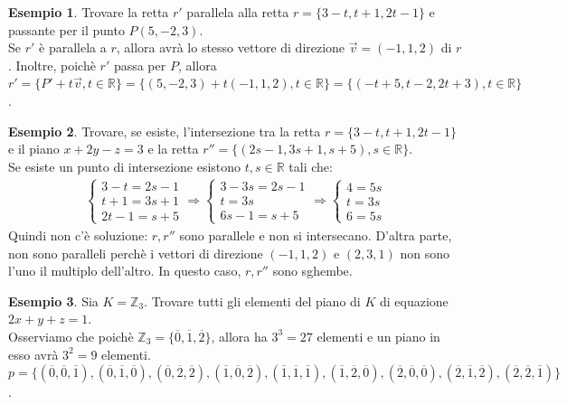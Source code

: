 \documentclass[a4paper]{article}
\theoremstyle{definition}
\newtheorem*{es}{Esempio}
\begin{document}
	\begin{es}
		Trovare la retta $r'$ parallela alla retta $r = \{3 - t, t + 1, 2t - 1\}$ e passante per il punto $P(5, -2, 3)$. \\
		Se $r'$ è parallela a $r$, allora avrà lo stesso vettore di direzione $\overrightarrow{v} = (-1, 1, 2)$ di $r$.
		Inoltre, poichè $r'$ passa per $P$, allora $r' = \{P' + t \overrightarrow{v}, t \in \mathbb{R}\}
		= \{(5, -2, 3) + t(-1, 1, 2), t \in \mathbb{R}\} = \{(-t + 5, t - 2, 2t + 3), t \in \mathbb{R}\}$.
	\end{es}

	\begin{es}
		Trovare, se esiste, l'intersezione tra la retta $r = \{3 - t, t + 1, 2t - 1\}$ e il piano $x + 2y - z = 3$ e la retta
		$r'' = \{(2s - 1, 3s + 1, s + 5), s \in \mathbb{R}\}$. \\
		Se esiste un punto di intersezione esistono $t, s \in \mathbb{R}$ tali che:
		\begin{align*}
			\begin{cases}
				3 - t = 2s - 1 \\
				t + 1 = 3s + 1 \\
				2t - 1 = s + 5
			\end{cases} \Rightarrow \begin{cases}
				3 - 3s = 2s - 1 \\
				t = 3s \\
				6s - 1 = s + 5
			\end{cases} \Rightarrow \begin{cases}
				4 = 5s \\
				t = 3s \\
				6 = 5s
			\end{cases}
		\end{align*}
		Quindi non c'è soluzione: $r, r''$ sono parallele e non si intersecano.
		D'altra parte, non sono paralleli perchè i vettori di direzione $(-1, 1, 2)$ e $(2, 3, 1)$ non sono l'uno il multiplo dell'altro.
		In questo caso, $r, r''$ sono sghembe.
	\end{es}

	\begin{es}
		Sia $K = \mathbb{Z}_3$. Trovare tutti gli elementi del piano di $K$ di equazione $2x + y + z = 1$. \\
		Osserviamo che poichè $\mathbb{Z}_3 = \{\overline{0}, \overline{1}, \overline{2}\}$, allora ha $3^3 = 27$ elementi e un piano in esso avrà $3^2 = 9$ elementi.
		$p = \{(\overline{0}, \overline{0}, \overline{1}), (\overline{0}, \overline{1}, \overline{0}), (\overline{0}, \overline{2}, \overline{2}),
		(\overline{1}, \overline{0}, \overline{2}), (\overline{1}, \overline{1}, \overline{1}), (\overline{1}, \overline{2}, \overline{0}),
		(\overline{2}, \overline{0}, \overline{0}), (\overline{2}, \overline{1}, \overline{2}), (\overline{2}, \overline{2}, \overline{1})\}$.
	\end{es}
\end{document}
